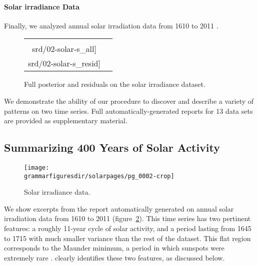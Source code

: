 \paragraph{Solar irradiance Data} 
Finally, we analyzed annual solar irradiation data from 1610 to 2011 \citep{lean1995reconstruction}.
%
\begin{figure}
\newcommand{\wsd}{0.5\columnwidth}  %
\newcommand{\hsd}{4cm}  %
\newcommand{\srd}{\grammarfiguresdir/decomposition/11-Feb-02-solar-s}  %
\newcommand{\mbs}{\hspace{-0.3cm}}  %
\begin{tabular}{cc}
\mbs \texttt{[image: \\srd/02-solar-s\_all]} &
\mbs \texttt{[image: \\srd/02-solar-s\_resid]}
\end{tabular}
\caption[Decomposition of model discovered on solar irradiance dataset]
{Full posterior and residuals on the solar irradiance dataset.}
\label{fig:solar_decomp}
\end{figure}
%








We demonstrate the ability of our procedure to discover and describe a variety of patterns on two time series.
Full automatically-generated reports for 13 data sets are provided as supplementary material.

\subsection{Summarizing 400 Years of Solar Activity}
\label{sec:solar}

\begin{figure}[h]
\centering
\texttt{[image: \\grammarfiguresdir/solarpages/pg\_0002-crop]}
\caption[Solar irradiance dataset]
{Solar irradiance data.}
\label{fig:solar}
\end{figure}

We show excerpts from the report automatically generated on annual solar irradiation data from 1610 to 2011 (figure~\ref{fig:solar}).
This time series has two pertinent features: a roughly 11-year cycle of solar activity, and a period lasting from 1645 to 1715 with much smaller variance than the rest of the dataset.
This flat region corresponds to the Maunder minimum, a period in which sunspots were extremely rare \citep{lean1995reconstruction}.
\procedurename{} clearly identifies these two features, as discussed below.



